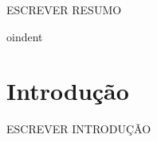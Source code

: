 \documentclass[
	12pt,				%
    oneside,			%
	a4paper,			%
	english,			%
	french,				%
	spanish,			%
	brazil,				%
	]{abntex2}
\begin{document}
\frenchspacing 


\imprimircapa

\imprimirfolhaderosto*

\begin{resumo} 
ESCREVER RESUMO




 \vspace{\onelineskip}
    
 
oindent

\end{resumo} %



\tableofcontents


\chapter{Introdução} %

ESCREVER INTRODUÇÃO

\end{document}
